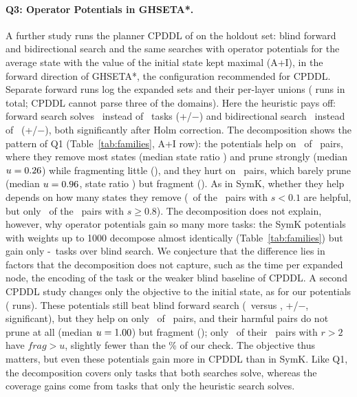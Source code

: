 \documentclass[letterpaper]{article}
\newcommand{\fragfactor}{\ensuremath{\mathit{frag}}}
\newcommand{\num}[1]{\numprint{#1}}
\theoremstyle{plain}
\theoremstyle{definition}
\theoremstyle{remark}
\begin{document}
\paragraph{Q3: Operator Potentials in GHSETA*.}
A further study runs the planner CPDDL of \citet{fiser-et-al-aij2024} on the holdout set: blind forward and bidirectional search and the same searches with operator potentials for the average state with the value of the initial state kept maximal (A+I), in the forward direction of GHSETA*, the configuration recommended for CPDDL.
Separate forward runs log the expanded sets and their per-layer unions (\num{6312} runs in total; CPDDL cannot parse three of the domains).
Here the heuristic pays off: forward search solves \CpSolvedPotFw\ instead of \CpSolvedBlindFw\ tasks (+\CpFwGains/$-$\CpFwLosses) and bidirectional search \CpSolvedPotBi\ instead of \CpSolvedBlindBi\ (+\CpBiGains/$-$\CpBiLosses), both significantly after Holm correction.
The decomposition shows the pattern of Q1 (Table~\ref{tab:families}, A+I row): the potentials help on \CpHelpful\ of \CpPairs\ pairs, where they remove most states (median state ratio \CpHelpStates) and prune strongly (median $u=0.26$) while fragmenting little (\CpHelpFrag), and they hurt on \CpHarmful\ pairs, which barely prune (median $u=0.96$, state ratio \CpHurtStates) but fragment (\CpHurtFrag).
As in SymK, whether they help depends on how many states they remove (\CpLowHelpful\ of the \CpLowPairs\ pairs with $s<0.1$ are helpful, but only \CpHighHelpful\ of the \CpHighPairs\ pairs with $s\geq0.8$).
The decomposition does not explain, however, why operator potentials gain so many more tasks: the SymK potentials with weights up to 1000 decompose almost identically (Table~\ref{tab:families}) but gain only \the\numexpr\StPotSolved-\StBlindSolved\relax\ tasks over blind search.
We conjecture that the difference lies in factors that the decomposition does not capture, such as the time per expanded node, the encoding of the task or the weaker blind baseline of CPDDL.
A second CPDDL study changes only the objective to the initial state, as for our potentials (\num{4208} runs).
These potentials still beat blind forward search (\CpISolvedPotFw\ versus \CpISolvedBlindFw, +\CpIGains/$-$\CpILosses, significant), but they help on only \CpIHelpful\ of \CpIPairs\ pairs, and their harmful pairs do not prune at all (median $u=1.00$) but fragment (\CpIHurtFrag); only \CpIStrongFrag\ of their \CpIStrong\ pairs with $r>2$ have $\fragfactor>u$, slightly fewer than the \GenStrongThresholdPercent\% of our check.
The objective thus matters, but even these potentials gain more in CPDDL than in SymK.
Like Q1, the decomposition covers only tasks that both searches solve, whereas the coverage gains come from tasks that only the heuristic search solves.
\end{document}
